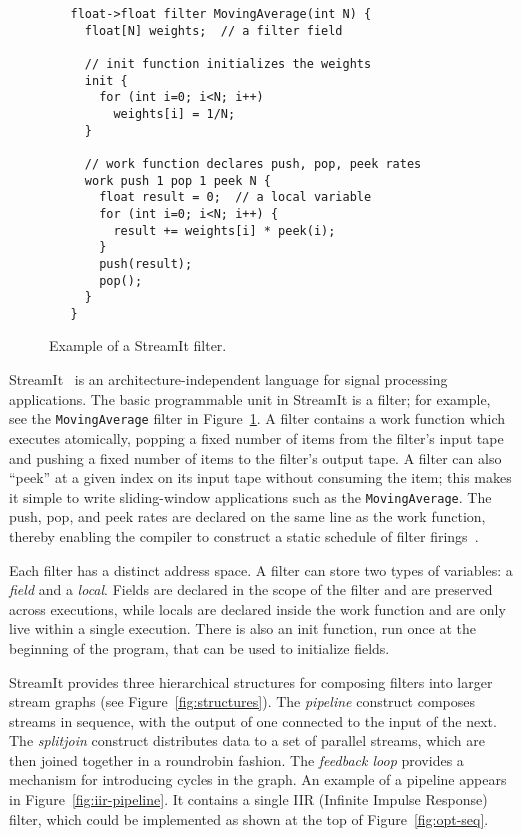 \begin{figure}[t]
{\scriptsize
\begin{verbatim}
   float->float filter MovingAverage(int N) {
     float[N] weights;  // a filter field

     // init function initializes the weights
     init {
       for (int i=0; i<N; i++)
         weights[i] = 1/N;
     }

     // work function declares push, pop, peek rates
     work push 1 pop 1 peek N {
       float result = 0;  // a local variable
       for (int i=0; i<N; i++) {
         result += weights[i] * peek(i);
       }
       push(result);
       pop();
     }
   } 
\end{verbatim}
\vspace{-12pt}
\caption{Example of a StreamIt filter.\protect\label{fig:filter-example}}}
\vspace{-6pt}
\end{figure}

\label{sec:background}

StreamIt~\cite{streamitcc} is an architecture-independent language for
signal processing applications.  The basic programmable unit in
StreamIt is a filter; for example, see the {\tt MovingAverage} filter
in Figure~\ref{fig:filter-example}.  A filter contains a work function
which executes atomically, popping a fixed number of items from the
filter's input tape and pushing a fixed number of items to the
filter's output tape.  A filter can also ``peek'' at a given index on
its input tape without consuming the item; this makes it simple to
write sliding-window applications such as the {\tt MovingAverage}.
The push, pop, and peek rates are declared on the same line as the
work function, thereby enabling the compiler to construct a static
schedule of filter firings~\cite{lee87static}.

Each filter has a distinct address space.  A filter can store two
types of variables: a {\it field} and a {\it local}.  Fields are
declared in the scope of the filter and are preserved across
executions, while locals are declared inside the work function and are
only live within a single execution.  There is also an init function,
run once at the beginning of the program, that can be used to
initialize fields.

StreamIt provides three hierarchical structures for composing filters
into larger stream graphs (see Figure~\ref{fig:structures}).  The {\it
pipeline} construct composes streams in sequence, with the output of
one connected to the input of the next.  The {\it splitjoin} construct
distributes data to a set of parallel streams, which are then joined
together in a roundrobin fashion.  The {\it feedback loop} provides a
mechanism for introducing cycles in the graph.  An example of a
pipeline appears in Figure~\ref{fig:iir-pipeline}.  It contains a
single IIR (Infinite Impulse Response) filter, which could be
implemented as shown at the top of Figure~\ref{fig:opt-seq}.

